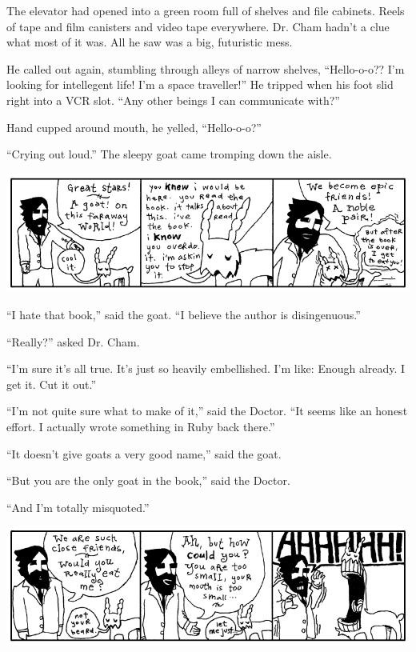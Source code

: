 \documentclass[10pt,twoside]{report}
\begin{document}
The elevator had opened into a green room full of shelves and file
cabinets.  Reels of tape and film canisters and video tape everywhere.
Dr. Cham hadn't a clue what most of it was.  All he saw was a big,
futuristic mess.

He called out again, stumbling through alleys of narrow shelves,
``Hello-o-o??  I'm looking for intellegent life!  I'm a space
traveller!''  He tripped when his foot slid right into a VCR
slot. ``Any other beings I can communicate with?''

Hand cupped around mouth, he yelled, ``Hello-o-o?''

``Crying out loud.''  The sleepy goat came tromping down the aisle.

\newpage


	\includegraphics[width=1.0\textwidth]{cache/43.png}

``I hate that book,'' said the goat.  ``I believe the author is
        disingenuous.''

``Really?'' asked Dr. Cham.

``I'm sure it's all true.  It's just so heavily embellished.  I'm
        like: Enough already.  I get it.  Cut it out.''

``I'm not quite sure what to make of it,'' said the Doctor.  ``It
        seems like an honest effort. I actually wrote something in
        Ruby back there.''

``It doesn't give goats a very good name,'' said the goat.

``But you are the only goat in the book,'' said the Doctor.

``And I'm totally misquoted.''

	\includegraphics[width=1.0\textwidth]{cache/44.png}
\end{document}
